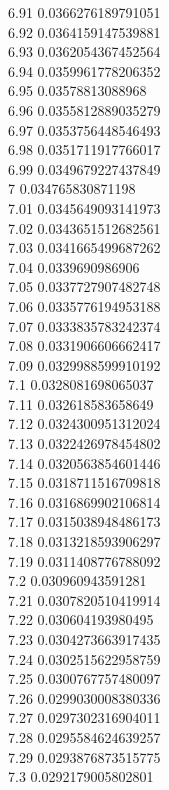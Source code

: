 {6.91	0.0366276189791051\\
6.92	0.0364159147539881\\
6.93	0.0362054367452564\\
6.94	0.0359961778206352\\
6.95	0.03578813088968\\
6.96	0.0355812889035279\\
6.97	0.0353756448546493\\
6.98	0.0351711917766017\\
6.99	0.0349679227437849\\
7	0.034765830871198\\
7.01	0.0345649093141973\\
7.02	0.0343651512682561\\
7.03	0.0341665499687262\\
7.04	0.0339690986906\\
7.05	0.0337727907482748\\
7.06	0.0335776194953188\\
7.07	0.0333835783242374\\
7.08	0.0331906606662417\\
7.09	0.0329988599910192\\
7.1	0.0328081698065037\\
7.11	0.032618583658649\\
7.12	0.0324300951312024\\
7.13	0.0322426978454802\\
7.14	0.0320563854601446\\
7.15	0.0318711516709818\\
7.16	0.0316869902106814\\
7.17	0.0315038948486173\\
7.18	0.0313218593906297\\
7.19	0.0311408776788092\\
7.2	0.030960943591281\\
7.21	0.0307820510419914\\
7.22	0.030604193980495\\
7.23	0.0304273663917435\\
7.24	0.0302515622958759\\
7.25	0.0300767757480097\\
7.26	0.0299030008380336\\
7.27	0.0297302316904011\\
7.28	0.0295584624639257\\
7.29	0.0293876873515775\\
7.3	0.0292179005802801\\
}
